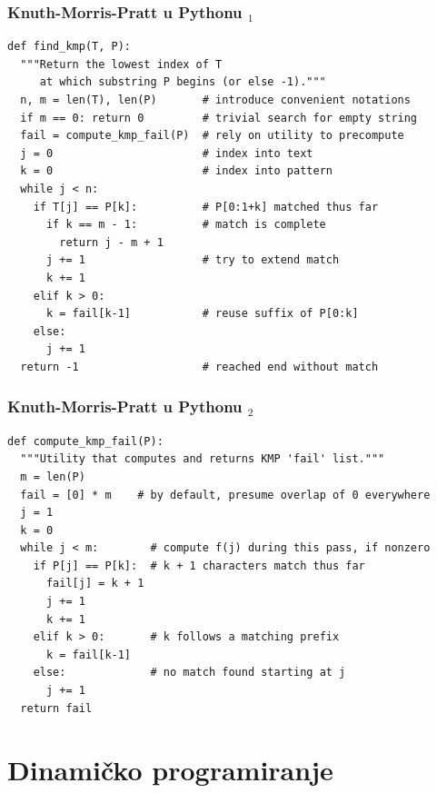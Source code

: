 \documentclass[compress]{beamer}
\begin{document}
\begin{frame}
  \frametitle{Knuth-Morris-Pratt u Pythonu $_1$}
\begin{verbatim}
def find_kmp(T, P):
  """Return the lowest index of T
     at which substring P begins (or else -1)."""
  n, m = len(T), len(P)       # introduce convenient notations
  if m == 0: return 0         # trivial search for empty string
  fail = compute_kmp_fail(P)  # rely on utility to precompute
  j = 0                       # index into text
  k = 0                       # index into pattern
  while j < n:
    if T[j] == P[k]:          # P[0:1+k] matched thus far
      if k == m - 1:          # match is complete
        return j - m + 1           
      j += 1                  # try to extend match
      k += 1
    elif k > 0:                    
      k = fail[k-1]           # reuse suffix of P[0:k]
    else:
      j += 1
  return -1                   # reached end without match
\end{verbatim}
\end{frame}

\begin{frame}[fragile,shrink=12]
  \frametitle{Knuth-Morris-Pratt u Pythonu $_2$}
\begin{verbatim}
def compute_kmp_fail(P):
  """Utility that computes and returns KMP 'fail' list."""
  m = len(P)
  fail = [0] * m    # by default, presume overlap of 0 everywhere
  j = 1
  k = 0
  while j < m:        # compute f(j) during this pass, if nonzero
    if P[j] == P[k]:  # k + 1 characters match thus far
      fail[j] = k + 1
      j += 1
      k += 1
    elif k > 0:       # k follows a matching prefix
      k = fail[k-1]
    else:             # no match found starting at j
      j += 1
  return fail
\end{verbatim}
\end{frame}

\section[Din prog]{Dinamičko programiranje}
\end{document}
